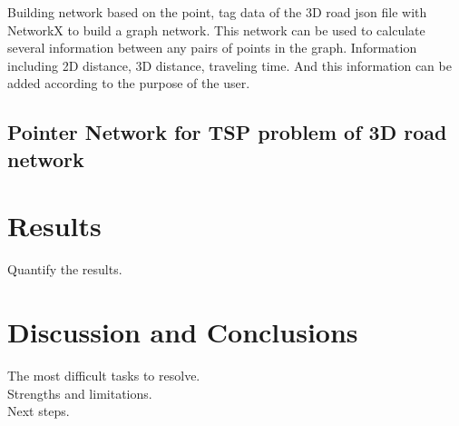\documentclass[final-report]{report-template}
\begin{document}
Building network based on the point, tag data of the 3D road json file with NetworkX to build a graph network.
This network can be used to calculate several information between any pairs of points in the graph.
Information including 2D distance, 3D distance, traveling time. And this information can be added according to the purpose of the user.

\subsection {Pointer Network for TSP problem of 3D road network}




\section {Results}
Quantify the results.\\

\section {Discussion and Conclusions}
The most difficult tasks to resolve.\\
Strengths and limitations.\\
Next steps.\\





\end{document}

